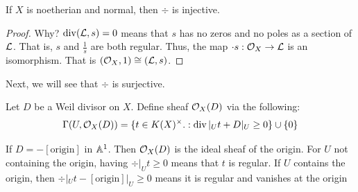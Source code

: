 \documentclass[12pt]{amsart}
\begin{document}
\begin{proposition}
    If $X$ is noetherian and normal, then $\div$ is injective. 
\end{proposition}

\begin{proof}
    Why? $\operatorname{div}(\mathcal{L}, s) = 0$ means that $s$ has no zeros and no poles as a section of $\mathcal{L}$. That is, $s$ and $\frac{1}{s}$ are both regular. Thus, the map $\cdot s:\mathcal{O}_X \to\mathcal{L}$ is an isomorphism. That is $(\mathcal{O}_X, 1) \cong (\mathcal{L}, s)$. 
\end{proof}

Next, we will see that $\div$ is surjective. 

\begin{definition}
    Let $D$ be a Weil divisor on $X$. Define sheaf $\mathcal{O}_X(D)$ via the following: 
    \[ \Gamma(U, \mathcal{O}_X(D)) = \{t \in K(X)^\times.: \operatorname{div}|_U t + D|_U \geq 0 \} \cup \{0\}\]
\end{definition}


\begin{example}
    If $D = -[\text{origin}]$ in $\mathbb A^1$. Then $\mathcal{O}_X(D)$ is the ideal sheaf of the origin. For $U$ not containing the origin, having $\div|_U t \geq 0$ means that $t$ is regular. If $U$ contains the origin, then $\div|_U t -[\text{origin}]|_U \geq 0$ means it is regular and vanishes at the origin
\end{example}

\newpage 



\end{document}
